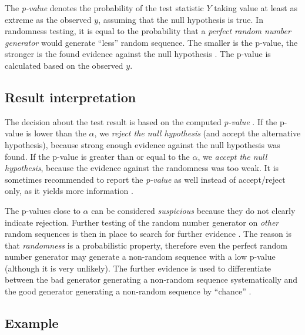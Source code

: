\documentclass[
  digital,     %
  oneside,     %
  nosansbold,  %
  nocolorbold, %
  nolof,         %
  nolot,         %
]{fithesis4}
\begin{document}

The \emph{p-value} denotes the probability of the test statistic $Y$ taking value at least as extreme as the observed $y$, assuming that the null hypothesis is true. In randomness testing, it is equal to the probability that a \emph{perfect random number generator} would generate ``less'' random sequence. The smaller is the p-value, the stronger is the found evidence against the null hypothesis \cite[p. 386]{basic_practice}. The p-value is calculated based on the observed $y$.



\subsection{Result interpretation} \label{chap:rand-interpretation}

The decision about the test result is based on the computed \emph{p-value} \cite[p.~390]{basic_practice}. If the p-value is lower than the $\alpha$, we \emph{reject the null hypothesis} (and accept the alternative hypothesis), because strong enough evidence against the null hypothesis was found. If the p-value is greater than or equal to the $\alpha$, we \emph{accept the null hypothesis}, because the evidence against the randomness was too weak. It is sometimes recommended to report the \emph{p-value} as well instead of accept/reject only, as it yields more information \cite[p. 90]{tu01_guide}.

The p-values close to $\alpha$ can be considered \emph{suspicious} because they do not clearly indicate rejection. Further testing of the random number generator on \emph{other} random sequences is then in place to search for further evidence \cite[p.~5]{tu01_paper}. The reason is that \emph{randomness} is a probabilistic property, therefore even the perfect random number generator may generate a non-random sequence with a low p-value (although it is very unlikely). The further evidence is used to differentiate between the bad generator generating a non-random sequence systematically and the good generator generating a non-random sequence by ``chance'' \cite[p. 90]{tu01_guide}.

\subsection{Example} \label{chap:rand-example}
\end{document}

